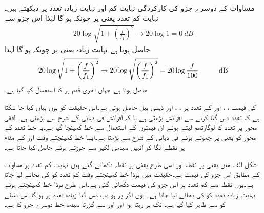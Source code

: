 مساوات کے دوسرے جزو کی کارکردگی نہایت کم اور نہایت زیادہ تعدد پر دیکھتے ہیں۔نہایت کم تعدد یعنی  پر چونکہ  ہو گا لہٰذا اس جزو سے
\begin{align} \label{مساوات_تعدد_ردعمل_بوڈا_کم_تعدد_حصہ}
20 \log  \sqrt{1+\left(\frac{f}{f_1}\right)^2}  \to 20 \log 1 =\SI{0}{dB}
\end{align}
حاصل ہوتا ہے۔نہایت زیادہ یعنی  پر چونکہ  ہو گا لہٰذا
\begin{align} \label{مساوات_تعدد_ردعمل_بوڈا_زیادہ_تعدد_حصہ}
20 \log  \sqrt{1+\left(\frac{f}{f_1}\right)^2} \to 20 \log \sqrt{\left(\frac{f}{f_1}\right)^2} =20 \log \frac{f}{100} \hspace{1 cm} \SI{}{dB}
\end{align}
حاصل ہوتا ہے جہاں آخری قدم پر  کا استعمال کیا گیا ہے۔

 کی قیمت ، ،  اور  کے تعدد پر ، ،  اور  ڈیسی بیل حاصل ہوتی ہے۔اس حقیقت کو یوں بیان کیا جا سکتا ہے کہ تعدد دس گنّا کرنے سے افزائش  بڑھتی ہے یا کہ افزائش   فی دہائی کے شرح سے بڑھتی ہے۔ افقی محور پر تعدد کا لوگارتھم لیتے ہوئے ان قیمتوں کے استعمال سے خط کھینچا گیا ہے۔یہ خط تعدد کے محور کو  یعنی  پر چھوتے ہوئے  فی دہائی کے شرح سے بڑھتا ہے۔ایسا خط کھینچتے وقت   اور   کے مقام پر نقطے  لگا کر انہیں سیدھی لکیر سے جوڑتے ہوئے حاصل کیا جاتا ہے۔

شکل  الف میں  یعنی  پر نقطہ  اور اسی طرح  یعنی  پر نقطہ  دکھائے گئے ہیں۔نہایت کم تعدد پر مساوات  کے مطابق اس جزو کی قیمت  ہے۔حقیقت میں بوڈا خط کھینچتے وقت کم تعدد کو  کی بجائے  لیا جاتا ہے۔یوں نقطہ  سے کم تعدد پر اس جزو کی قیمت  دکھائی گئی ہے۔اس طرح بوڈا خط کھینچتے ہوئے  نہایت زیادہ تعدد کو  کی بجائے  لیا جاتا ہے۔ یوں اگر  پر  ہو تب دس گنا زیادہ تعدد پر  ہو گا۔اس نقطے  کو  سے ظاہر کیا گیا ہے۔ تک  پر رہتا ہوا اور  اور  سے گزرتا سیدھا خط دوسرے جزو کا  ہے۔


